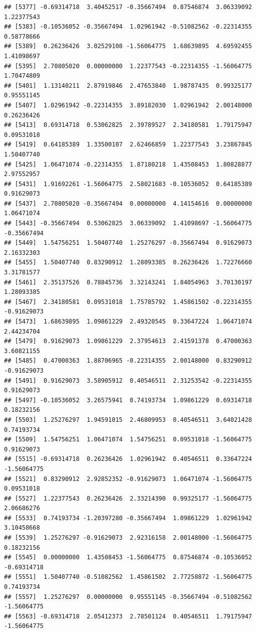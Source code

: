 \documentclass[
]{article}
\begin{document}
\begin{verbatim}
## [5377] -0.69314718  3.40452517 -0.35667494  0.87546874  3.06339092  1.22377543
## [5383] -0.10536052 -0.35667494  1.02961942 -0.51082562 -0.22314355  0.58778666
## [5389]  0.26236426  3.02529108 -1.56064775  1.68639895  4.69592455  1.41098697
## [5395]  2.70805020  0.00000000  1.22377543 -0.22314355 -1.56064775  1.70474809
## [5401]  1.13140211  2.87919846  2.47653840  1.98787435  0.99325177  0.95551145
## [5407]  1.02961942 -0.22314355  3.89182030  1.02961942  2.00148000  0.26236426
## [5413]  0.69314718  0.53062825  2.39789527  2.34180581  1.79175947  0.09531018
## [5419]  0.64185389  1.33500107  2.62466859  1.22377543  3.23867845  1.50407740
## [5425]  1.06471074 -0.22314355  1.87180218  1.43508453  1.80828877  2.97552957
## [5431]  1.91692261 -1.56064775  2.58021683 -0.10536052  0.64185389  0.91629073
## [5437]  2.70805020 -0.35667494  0.00000000  4.14154616  0.00000000  1.06471074
## [5443] -0.35667494  0.53062825  3.06339092  1.41098697 -1.56064775 -0.35667494
## [5449]  1.54756251  1.50407740  1.25276297 -0.35667494  0.91629073  2.16332303
## [5455]  1.50407740  0.83290912  1.28093385  0.26236426  1.72276660  3.31781577
## [5461]  2.35137526  0.78845736  3.32143241  1.84054963  3.70130197  1.28093385
## [5467]  2.34180581  0.09531018  1.75785792  1.45861502 -0.22314355 -0.91629073
## [5473]  1.68639895  1.09861229  2.49320545  0.33647224  1.06471074  2.44234704
## [5479]  0.91629073  1.09861229  2.37954613  2.41591378  0.47000363  3.60821155
## [5485]  0.47000363  1.88706965 -0.22314355  2.00148000  0.83290912 -0.91629073
## [5491]  0.91629073  3.58905912  0.40546511  2.31253542 -0.22314355  0.91629073
## [5497] -0.10536052  3.26575941  0.74193734  1.09861229  0.69314718  0.18232156
## [5503]  1.25276297  1.94591015  2.46809953  0.40546511  3.64021428  0.74193734
## [5509]  1.54756251  1.06471074  1.54756251  0.09531018 -1.56064775  0.91629073
## [5515] -0.69314718  0.26236426  1.02961942  0.40546511  0.33647224 -1.56064775
## [5521]  0.83290912  2.92852352 -0.91629073  1.06471074 -1.56064775  0.09531018
## [5527]  1.22377543  0.26236426  2.33214390  0.99325177 -1.56064775  2.06686276
## [5533]  0.74193734 -1.20397280 -0.35667494  1.09861229  1.02961942  3.10458668
## [5539]  1.25276297 -0.91629073  2.92316158  2.00148000 -1.56064775  0.18232156
## [5545]  0.00000000  1.43508453 -1.56064775  0.87546874 -0.10536052 -0.69314718
## [5551]  1.50407740 -0.51082562  1.45861502  2.77258872 -1.56064775  0.74193734
## [5557]  1.25276297  0.00000000  0.95551145 -0.35667494 -0.51082562 -1.56064775
## [5563] -0.69314718  2.05412373  2.78501124  0.40546511  1.79175947 -1.56064775

\end{verbatim}
\end{document}
